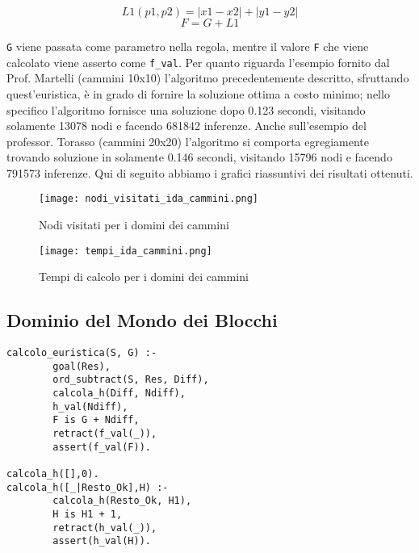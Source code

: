 $$ L1(p1,p2) = |x1 - x2| + |y1 - y2|$$
$$F = G + L1$$

\lstinline{G} viene passata come parametro nella regola, mentre il valore \lstinline{F} che viene calcolato viene asserto come \lstinline{f_val}. Per quanto riguarda l'esempio fornito dal Prof. Martelli (cammini 10x10) l'algoritmo precedentemente descritto, sfruttando quest'euristica, è in grado di fornire la soluzione ottima a costo minimo; nello specifico l'algoritmo fornisce una soluzione dopo 0.123 secondi, visitando solamente 13078 nodi e facendo 681842 inferenze. Anche sull'esempio del professor. Torasso (cammini 20x20) l'algoritmo si comporta egregiamente trovando soluzione in solamente 0.146 secondi, visitando 15796 nodi e facendo 791573 inferenze.
Qui di seguito abbiamo i grafici riassuntivi dei risultati ottenuti.

\begin{figure}[htp]
  \texttt{[image: nodi\_visitati\_ida\_cammini.png]}
  \caption{Nodi visitati per i domini dei cammini}
  \label{fig:figure9}
\end{figure}

\begin{figure}[htp]
  \texttt{[image: tempi\_ida\_cammini.png]}
  \caption{Tempi di calcolo per i domini dei cammini}
  \label{fig:figure10}
\end{figure}

\subsection{Dominio del Mondo dei Blocchi}

\begin{lstlisting}
calcolo_euristica(S, G) :-
        goal(Res),
        ord_subtract(S, Res, Diff),
        calcola_h(Diff, Ndiff),
        h_val(Ndiff),
        F is G + Ndiff,
        retract(f_val(_)),
        assert(f_val(F)).

calcola_h([],0).
calcola_h([_|Resto_Ok],H) :-
        calcola_h(Resto_Ok, H1),
        H is H1 + 1,
        retract(h_val(_)),
        assert(h_val(H)).
\end{lstlisting}

